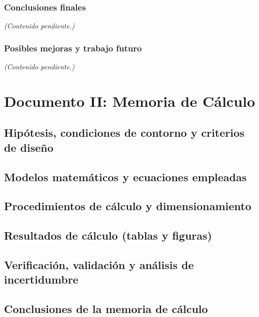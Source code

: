 \documentclass[12pt,a4paper,oneside]{report}
\newcommand{\pendiente}{\noindent\textit{(Contenido pendiente.)}\par}
\begin{document}
\subsection{Conclusiones finales}
\pendiente

\subsection{Posibles mejoras y trabajo futuro}
\pendiente




\chapter{Documento II: Memoria de Cálculo}

\section{Hipótesis, condiciones de contorno y criterios de diseño}
\section{Modelos matemáticos y ecuaciones empleadas}
\section{Procedimientos de cálculo y dimensionamiento}
\section{Resultados de cálculo (tablas y figuras)}
\section{Verificación, validación y análisis de incertidumbre}
\section{Conclusiones de la memoria de cálculo}






\clearpage

\end{document}
